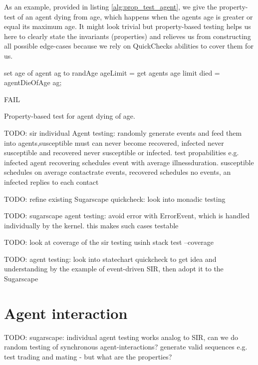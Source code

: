 As an example, provided in listing \ref{alg:prop_test_agent}, we give the property-test of an agent dying from age, which happens when the agents age is greater or equal its maximum age. It might look trivial but property-based testing helps us here to clearly state the invariants (properties) and relieves us from constructing all possible edge-cases because we rely on QuickChecks abilities to cover them for us.

\begin{algorithm}
set age of agent ag to randAge\;
ageLimit = get agents age limit\; 
died = agentDieOfAge ag;\

 {
  FAIL\;
}
\caption{Property-based test for agent dying of age.}
\end{algorithm}
\label{alg:prop_test_agent}


TODO: sir individual Agent testing: randomly generate events and feed them into agents,susceptible must can never become recovered, infected never susceptible and recovered never susceptible or infected. test propabilities e.g. infected agent recovering schedules event with average illnessduration. susceptible schedules on average contactrate events, recovered schedules no events, an infected replies to each contact

TODO: refine existing Sugarscape quickcheck: look into monadic testing

TODO: sugarscape agent testing: avoid error with ErrorEvent, which is handled individually by the kernel. this makes such cases testable

TODO: look at coverage of the sir testing usinh stack test --coverage

TODO: agent testing: look into statechart quickcheck to get idea and understanding by the example of event-driven SIR, then adopt it to the Sugarscape

\section{Agent interaction}

TODO: sugarscape: individual agent testing works analog to SIR, can we do random testing of synchronous agent-interactions? generate valid sequences e.g. test trading and mating - but what are the properties?